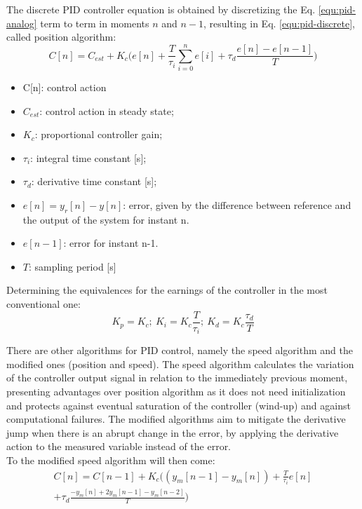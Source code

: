 The discrete PID controller equation is obtained by discretizing the Eq. \ref{equ:pid-analog} term to term in moments \(n\) and \(n-1\), resulting in
Eq. \ref{equ:pid-discrete}, called position algorithm:
\begingroup
\small
\begin{equation}
\label{equ:pid-discrete}
C[n] = C_{est} {+} K_c\bigg(e[n] {+} \frac{T}{\tau_i} \sum_{i=0}^n e[i] + \tau_d \frac{e[n]{-}e[n {-} 1]}{T}\bigg)
\end{equation}
\endgroup
\begin{itemize}
\item C[n]: control action
\item \(C_{est}\): control action in steady state;
\item \(K_c\): proportional controller gain;
\item \(\tau_i\): integral time constant [s];
\item \(\tau_d\): derivative time constant [s];
\item \(e[n] = y_r[n] - y[n]\): error, given by the difference between reference and the output of the system for instant n.
\item \(e[n{-}1]\): error for instant n-1.
\item \(T\): sampling period [s]
\end{itemize}
Determining the equivalences for the earnings of the controller in the most conventional one: 
\begin{equation}
\label{equ:pid-discrete-params}
K_p = K_c;~K_i = K_c\frac{T}{\tau_i};~K_d = K_c \frac{\tau_d}{T}
\end{equation}

There are other algorithms for PID control, namely the speed algorithm and the modified ones (position and speed). The speed algorithm calculates the variation of the controller output signal in relation to the immediately previous moment, presenting advantages over position algorithm as it does not need initialization and protects against eventual saturation of the controller (wind-up) and against computational failures. The modified algorithms aim to mitigate the derivative jump when there is an abrupt change in the error, by applying the derivative action to the measured variable instead of the error.\\

To the modified speed algorithm will then come:
\begin{equation}
\label{equ:pid-discrete-veloc-modif}
\begin{split}
C[n] = C[n-1] + K_c\bigg((y_m[n{-}1]-y_m[n]) + \frac{T}{\tau_i} e[n] \\ + \tau_d \frac{{-} y_m[n] {+} 2 y_m[n{-}1] {-} y_m[n{-}2] }{T}\bigg)
\end{split}
\end{equation}



	
